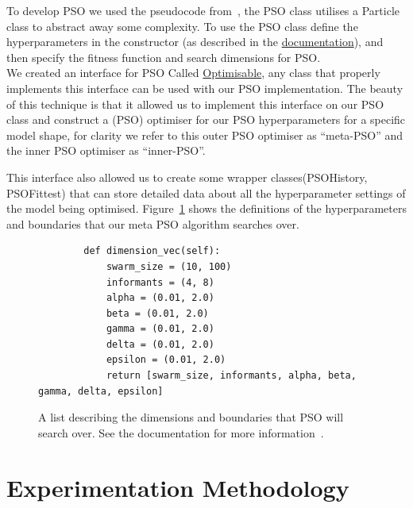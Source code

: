 \documentclass[12pt]{article}
\begin{document}
\noindent To develop PSO we used the pseudocode from~\autocite{lukeEssentialsMetaheuristicsSet2013}, the PSO class utilises a Particle class to abstract away some complexity.
To use the PSO class define the hyperparameters in the constructor (as described in the \href{https://www2.macs.hw.ac.uk/~sf52/Bio-Comp-docs/html/Coursework.PSO.html?highlight=pso#Coursework.PSO.pswarm.PSO}{documentation}), and then specify the fitness function and search dimensions for PSO. \\

\noindent We created an interface for PSO Called \href{https://www2.macs.hw.ac.uk/~sf52/Bio-Comp-docs/html/Coursework.PSO.html?highlight=optimisable#Coursework.PSO.interface.Optimisable}{Optimisable}, any class that properly implements this interface can be used with our PSO implementation. 
The beauty of this technique is that it allowed us to implement this interface on our PSO class and construct a (PSO) optimiser for our PSO hyperparameters for a specific model shape, for clarity we refer to this outer PSO optimiser as ``meta-PSO'' and the inner PSO optimiser as ``inner-PSO''.

This interface also allowed us to create some wrapper classes(PSOHistory, PSOFittest) that can store detailed data about all the hyperparameter settings of the model being optimised.
Figure~\ref{fig:dimensionVec} shows the definitions of  the hyperparameters and boundaries that our meta PSO algorithm searches over. 

\begin{figure}[h]
    \begin{verbatim}
        def dimension_vec(self):
            swarm_size = (10, 100)
            informants = (4, 8)
            alpha = (0.01, 2.0)
            beta = (0.01, 2.0)
            gamma = (0.01, 2.0)
            delta = (0.01, 2.0)
            epsilon = (0.01, 2.0)
            return [swarm_size, informants, alpha, beta, gamma, delta, epsilon]
    \end{verbatim}
    \caption{A list describing the dimensions and boundaries that PSO will search over. See the documentation for more information~\autocite{fay-huntBiologicallyInspiredComputation}.}
    \label{fig:dimensionVec}
\end{figure}


\newpage
\section{Experimentation Methodology}\label{sec:experiment}
\end{document}
